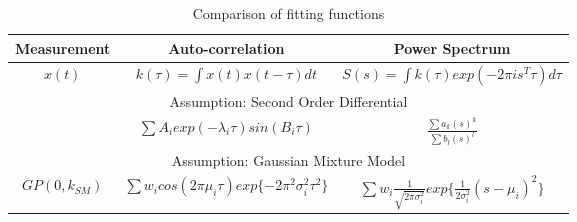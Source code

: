 \renewcommand{\arraystretch}{1.2}
\begin{table}[!h]
    \centering
\begin{tabularx}{0.915\textwidth}{c|c|c}
  \hline
  Measurement & Auto-correlation & Power Spectrum \\
  \hline
  $x(t)$ & $k(\tau) = \int x(t)x(t-\tau)dt$ &  $S(s) = \int k(\tau)exp(-2 \pi i s^{T} \tau )d\tau$\\
  \hline \hline
  \multicolumn{3}{|c|}{Assumption: Second Order Differential}\\
  \hline
   & $ \sum A_{i}exp(-\lambda_{i}\tau)sin(B_{i}\tau)$ & $\frac{\sum a_{k}(s)^{k}}{\sum b_{l}(s)^{l}}$\\
   \hline \hline
   \multicolumn{3}{|c|}{Assumption: Gaussian Mixture Model}\\
   \hline
   $GP(0 , k_{SM})$ 
   & $  \sum w_{i} cos(2\pi\mu_{i}\tau) exp\{-2\pi^{2}\sigma_{i}^{2}\tau^{2}\}$ 
   & $ \sum w_{i}  \frac{1}{\sqrt{2\pi\sigma_{i}^{2}}}exp\{\frac{1}{2\sigma_{i}^{2}}(s-\mu_{i})^{2}\} $\\
   \hline
\end{tabularx}
\caption{Comparison of fitting functions}
  \label{tab:comparisonOfFittingFunctions}
\end{table}

